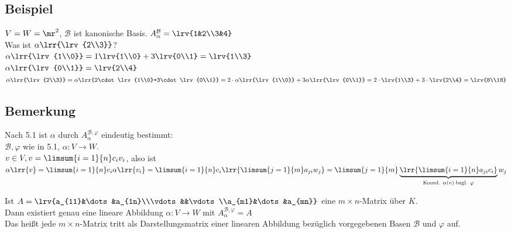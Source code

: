 \subsection{Beispiel}
	$V=W=\mr^2$, $\mathcal{B}$ ist kanonische Basis. $A_\alpha^{\mathcal{B}}=\lrv{1&2\\3&4}$\\
	Was ist $\alpha\lrr{\lrv{2\\3}}$?\\
	$\alpha\lrr{\lrv{1\\0}}=1\lrv{1\\0}+3\lrv{0\\1}=\lrv{1\\3}$\\
	$\alpha\lrr{\lrv{0\\1}}=\lrv{2\\4}$\\
	$\alpha\lrr{\lrv{2\\3}}=\alpha\lrr{2\cdot\lrv{1\\0}+3\cdot\lrv{0\\1}}=2\cdot\alpha\lrr{\lrv{1\\0}}+3\alpha\lrr{\lrv{0\\1}}=2\cdot\lrv{1\\3}+3\cdot\lrv{2\\4}=\lrv{8\\18}$

\subsection{Bemerkung}
		\item Nach 5.1 ist $\alpha$ durch $A_{\alpha}^{\mathcal{B}, \varphi}$ eindeutig bestimmt:\\
			$\mathcal{B},\varphi$ wie in 5.1, $\alpha:V\rightarrow W$.\\
			$v\in V, v=\limsum{i=1}{n}c_iv_i$, also ist\\
			$\alpha\lrr{v}=\limsum{i=1}{n}c_i\alpha\lrr{v_i}=\limsum{i=1}{n}c_i\lrr{\limsum{j=1}{m}a_{ji}w_j}=\limsum{j=1}{m}\underbrace{\lrr{\limsum{i=1}{n}a_{ji}c_i}}_{\mbox{\scriptsize Koord. }\scriptstyle \alpha(v)\mbox{\scriptsize \;bzgl. }\scriptstyle\varphi}w_j$
		\item Ist $A=\lrv{a_{11}&\dots&a_{1n}\\\vdots&&\vdots\\a_{m1}&\dots&a_{mn}}$ eine $m\times n$-Matrix über $K$.\\
			Dann existiert genau eine lineare Abbildung $\alpha:V\rightarrow W$ mit $A_{\alpha}^{\mathcal{B}, \varphi}=A$\\
			Das heißt jede $m\times n$-Matrix tritt als Darstellungsmatrix einer linearen Abbildung bezüglich vorgegebenen Basen $\mathcal{B}$ und $\varphi$ auf.

